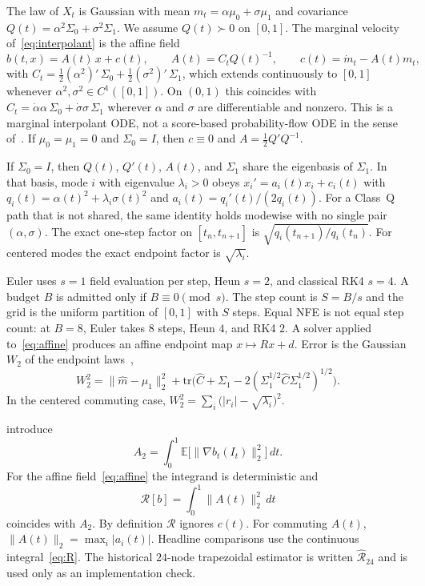 \documentclass[11pt,a4paper]{article}
\theoremstyle{remark}
\newcommand{\wtwo}{W_2}
\newcommand{\cR}{\mathcal{R}}
\newcommand{\Rhat}{\widehat{\mathcal{R}}_{24}}
\begin{document}
The law of $X_t$ is Gaussian with mean $m_t=\alpha\mu_0+\sigma\mu_1$ and
covariance $Q(t)=\alpha^2\Sigma_0+\sigma^2\Sigma_1$. We assume $Q(t)\succ 0$
on $[0,1]$. The marginal velocity of~\eqref{eq:interpolant} is the affine
field
\begin{equation}
  b(t,x)=A(t)\,x+c(t),\qquad
  A(t)=C_t Q(t)^{-1},\qquad
  c(t)=\dot m_t-A(t)m_t,
  \label{eq:affine}
\end{equation}
with
$C_t=\tfrac12(\alpha^2)'\,\Sigma_0+\tfrac12(\sigma^2)'\,\Sigma_1$, which
extends continuously to $[0,1]$ whenever $\alpha^2,\sigma^2\in C^1([0,1])$.
On $(0,1)$ this coincides with
$C_t=\dot\alpha\alpha\,\Sigma_0+\dot\sigma\sigma\,\Sigma_1$ wherever
$\alpha$ and $\sigma$ are differentiable and nonzero. This is a
marginal interpolant ODE, not a score-based probability-flow ODE in the sense
of~\citet{song2021score}. If $\mu_0=\mu_1=0$ and $\Sigma_0=I$, then $c\equiv 0$
and $A=\tfrac12 Q'Q^{-1}$.

If $\Sigma_0=I$, then $Q(t)$, $Q'(t)$, $A(t)$, and $\Sigma_1$ share the
eigenbasis of $\Sigma_1$. In that basis, mode $i$ with eigenvalue
$\lambda_i>0$ obeys $x_i'=a_i(t)x_i+c_i(t)$ with
$q_i(t)=\alpha(t)^2+\lambda_i\sigma(t)^2$ and
$a_i(t)=q_i'(t)/(2q_i(t))$. For a Class~Q path that is not shared, the
same identity holds modewise with no single pair $(\alpha,\sigma)$. The
exact one-step factor on $[t_n,t_{n+1}]$ is
$\sqrt{q_i(t_{n+1})/q_i(t_n)}$. For centered modes the exact endpoint factor
is $\sqrt{\lambda_i}$.

Euler uses $s=1$ field evaluation per step, Heun $s=2$, and classical RK4
$s=4$. A budget $B$ is admitted only if $B\equiv 0\pmod s$. The step count
is $S=B/s$ and the grid is the uniform partition of $[0,1]$ with $S$ steps.
Equal NFE is not equal step count: at $B=8$, Euler takes $8$ steps, Heun $4$,
and RK4 $2$. A solver applied to~\eqref{eq:affine} produces an affine
endpoint map $x\mapsto Rx+d$. Error is the Gaussian $\wtwo$ of the endpoint
laws~\citep{gelbrich1990formula,peyre2019computational},
\begin{equation}
  \wtwo^2=\|\hat m-\mu_1\|_2^2
  +\mathrm{tr}\bigl(\hat C+\Sigma_1-2(\Sigma_1^{1/2}\hat C\Sigma_1^{1/2})^{1/2}\bigr).
\end{equation}
In the centered commuting case,
$\wtwo^2=\sum_i\bigl(|r_i|-\sqrt{\lambda_i}\bigr)^2$.

\citet[Definition~3.2]{lipschitzguided2025} introduce
\begin{equation}
  A_2=\int_0^1 \mathbb{E}\bigl[\bigl\|\nabla b_t(I_t)\bigr\|_2^2\bigr]\,dt.
\end{equation}
For the affine field~\eqref{eq:affine} the integrand is deterministic and
\begin{equation}
  \cR[b]=\int_0^1 \bigl\|A(t)\bigr\|_2^2\,dt
  \label{eq:R}
\end{equation}
coincides with $A_2$. By definition $\cR$ ignores $c(t)$. For commuting
$A(t)$, $\|A(t)\|_2=\max_i |a_i(t)|$. Headline comparisons use the continuous
integral~\eqref{eq:R}. The historical $24$-node trapezoidal estimator is
written $\Rhat$ and is used only as an implementation check.
\end{document}
